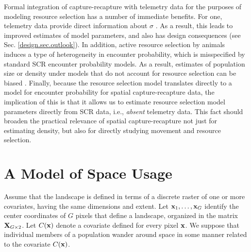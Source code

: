 Formal integration of capture-recapture with telemetry data for the
purposes of modeling resource selection has a number of immediate
benefits. For one, telemetry data provide direct information about
$\sigma$
\citep{sollmann_etal:2012ecol,sollmann_etal:inprepjapplecol}. As a
result, this leads to improved estimates of model parameters, and also
has design consequences (see Sec. \ref{design.sec.outlook}).  In
addition, active resource selection by animals induces a type of
heterogeneity in encounter probability, which is misspecified by
standard SCR encounter probability models. 
As a result, estimates of
population size or density under models that do not account for
resource selection can be biased \citep{royle_etal:2012mee}.  Finally,
because the resource selection model translates directly to a model
for encounter probability for spatial capture-recapture data, the
implication of this is that it allows us to estimate resource
selection model parameters directly from SCR data, i.e., {\it absent}
telemetry data. This fact should broaden the practical relevance of
spatial capture-recapture not just for estimating density, but also
for directly studying movement and resource selection.








\section{A Model of Space Usage}

\label{rsf.sec.rsfmodel}


Assume that the landscape is defined in terms of a discrete raster of
one or more covariates, having the same dimensions and extent.  Let
${\bf x}_{1},\ldots,{\bf x}_{G}$ identify the center coordinates of
$G$ pixels that define a landscape, organized in the 
 matrix ${\bf X}_{G \times 2}$.  Let $C({\bf x})$ denote a
covariate defined for every pixel ${\bf x}$.  We suppose
that individual members of a population wander around space in some
manner related to the covariate $C({\bf x})$.

